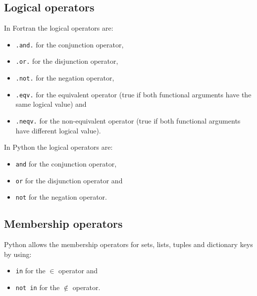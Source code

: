         
        \subsection*{Logical operators}
        In Fortran the logical operators are:
        \vspace{-0.5cm}
        \begin{itemize}[noitemsep]
            \item \texttt{.and.} for the conjunction operator, 
            \item \texttt{.or.} for the disjunction operator,
            \item \texttt{.not.} for the negation operator,
            \item \texttt{.eqv.} for the equivalent operator (true if both functional arguments have the same logical value) and
            \item \texttt{.neqv.} for the non-equivalent operator (true if both functional arguments have different logical value).
        \end{itemize}
    
        In Python the logical operators are:
        \vspace{-0.5cm}
        \begin{itemize}[noitemsep]
            \item \texttt{and} for the conjunction operator, 
            \item \texttt{or} for the disjunction operator and
            \item \texttt{not} for the negation operator.
        \end{itemize}
        
        
        \subsection*{Membership operators}
        
        Python allows the membership operators for sets, lists, tuples and dictionary keys by using:
        \vspace{-0.5cm}
        \begin{itemize}[noitemsep]
            \item \texttt{in} for the $\in$ operator and
            \item \texttt{not in} for the $\notin$ operator.
        \end{itemize}        
      
      
      
